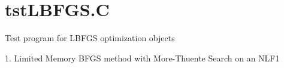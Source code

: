 \hypertarget{tstLBFGS_8C-example}{
\section{tstLBFGS.C}
}
Test program for LBFGS optimization objects

1. Limited Memory BFGS method with More-\/Thuente Search on an NLF1


\begin{DoxyCodeInclude}
\end{DoxyCodeInclude}
 